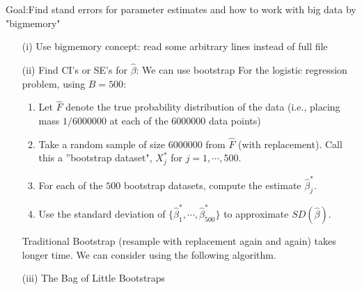 \documentclass[11pt]{article}
\begin{document}
Goal:Find stand errors for parameter estimates and how to work with big data by "bigmemory"
\begin{itemize}
  \item[(i)] Use bigmemory concept: read some arbitrary lines instead of full file
  \item[(ii)] Find CI's or SE's for  $\hat{\beta}$: We can use bootstrap
  For the logistic regression problem, using $B=500$:
    \begin{enumerate}
        \item Let $\hat{F}$ denote the true probability distribution of the data (i.e., placing mass $1/6000000$ at each of the $6000000$ data points)
        \item Take a random sample of size $6000000$ from $\hat{F}$ (with replacement). Call this a ''bootstrap dataset", $X_j^*$ for $j=1,\cdots,500$.
        \item For each of the $500$ bootstrap datasets, compute the estimate $\hat{\beta}_j^*$.
        \item Use the standard deviation of $\{\hat{\beta}_1^*,\cdots,\hat{\beta}_{500}^*\}$ to approximate $SD(\hat{\beta})$.
    \end{enumerate}

  Traditional Bootstrap (resample with replacement again and again) takes longer time. We can consider using the following algorithm.

  \item[(iii)] The Bag of Little Bootstraps


\end{itemize}
\end{document}
